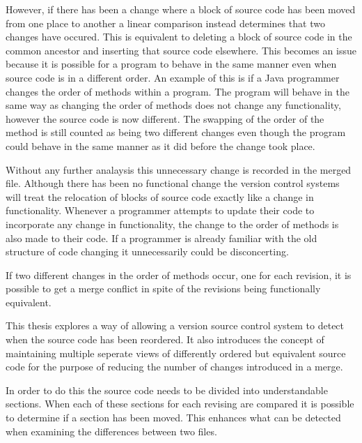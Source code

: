 
However, if there has been a change where a block of source code has been moved from one place to another a linear comparison instead determines that two changes have occured.  This is equivalent to deleting a block of source code in the common ancestor and inserting that source code elsewhere. This becomes an issue because it is possible for a program to behave in the same manner even when source code is in a different order.  An example of this is if a Java programmer changes the order of methods within a program.  The program will behave in the same way as changing the order of methods does not change any functionality, however the source code is now different. The swapping of the order of the method is still counted as being two different changes even though the program could behave in the same manner as it did before the change took place.

Without any further analaysis this unnecessary change is recorded in the merged file.  Although there has been no functional change the version control systems will treat the relocation of blocks of source code exactly like a change in functionality.  Whenever a programmer attempts to update their code to incorporate any change in functionality, the change to the order of methods is also made to their code.  If a programmer is already familiar with the old structure of code changing it unnecessarily could be disconcerting.   

If two different changes in the order of methods occur, one for each revision, it is possible to get a merge conflict in spite of the revisions being functionally equivalent.

This thesis explores a way of allowing a version source control system to detect when the source code has been reordered.  It also introduces the concept of maintaining multiple seperate views of differently ordered but equivalent source code for the purpose of reducing the number of changes introduced in a merge. 
 
In order to do this the source code needs to be divided into understandable sections. When each of these sections for each revising are compared it is possible to determine if a section has been moved.  This enhances what can be detected when examining the differences between two files.



